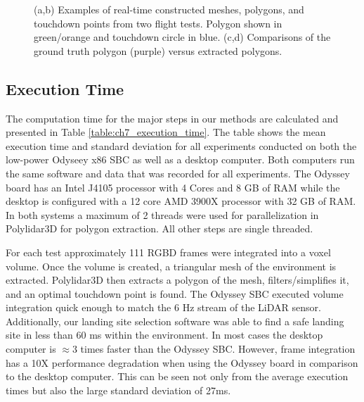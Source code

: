 \begin{figure}[!htb]
\begin{subfigure}[t]{.30\linewidth}
    \caption{\label{fig:ch7_flight_poly_b}}
  \end{subfigure}
  \caption[Real-time Constructed Meshes and Polygons During Flight Test]{(a,b) Examples of real-time constructed meshes, polygons, and touchdown points from two flight tests. Polygon shown in green/orange and touchdown circle in blue. (c,d) Comparisons of the ground truth polygon (purple) versus extracted polygons. }\label{fig:ch7_mesh_flight}
\end{figure}




\subsection{Execution Time} \label{sec:ch7_results_execution_time}

The computation time for the major steps in our methods are calculated and presented in Table \ref{table:ch7_execution_time}. The table shows the mean execution time and standard deviation for all experiments conducted on both the low-power Odyseey x86 \ac{SBC} as well as a desktop computer. Both computers run the same software and data that was recorded for all experiments. The Odyssey board has an Intel J4105 processor with 4 Cores and 8 GB of RAM while the desktop is configured with a 12 core AMD 3900X processor with 32 GB of RAM. In both systems a maximum of 2 threads were used for parallelization in Polylidar3D for polygon extraction. All other steps are single threaded. 

For each test approximately 111 \ac{RGBD} frames were integrated into a voxel volume.  Once the volume is created, a triangular mesh of the environment is extracted.  Polylidar3D then extracts a polygon of the mesh, filters/simplifies it, and an optimal touchdown point is found. The Odyssey \ac{SBC} executed volume integration quick enough to match the 6 Hz stream of the LiDAR sensor. Additionally, our landing site selection software was able to find a safe landing site in less than 60 ms within the environment. In most cases the desktop computer is $\approx3$ times faster than the Odyssey \ac{SBC}. However, frame integration has a 10X performance degradation when using the Odyssey board in comparison to the desktop computer.  This can be seen not only from the average execution times but also the large standard deviation of 27ms. 

